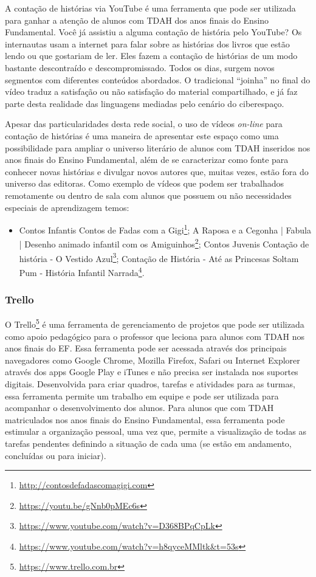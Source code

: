 \documentclass{textolivre}
\begin{document}
A contação de histórias via YouTube é uma ferramenta que pode ser utilizada para ganhar a atenção de alunos com TDAH dos anos finais do Ensino Fundamental. Você já assistiu a alguma contação de história pelo YouTube? Os internautas usam a internet para falar sobre as histórias dos livros que estão lendo ou que gostariam de ler. Eles fazem a contação de histórias de um modo bastante descontraído e descompromissado. Todos os dias, surgem novos segmentos com diferentes conteúdos abordados. O tradicional “joinha” no final do vídeo traduz a satisfação ou não satisfação do material compartilhado, e já faz parte desta realidade das linguagens mediadas pelo cenário do ciberespaço. 

Apesar das particularidades desta rede social, o uso de vídeos \textit{on-line} para contação de histórias é uma maneira de apresentar este espaço como uma possibilidade para ampliar o universo literário de alunos com TDAH inseridos nos anos finais do Ensino Fundamental, além de se caracterizar como fonte para conhecer novas histórias e divulgar novos autores que, muitas vezes, estão fora do universo das editoras. Como exemplo de vídeos que podem ser trabalhados remotamente ou dentro de sala com alunos que possuem ou não necessidades especiais de aprendizagem temos: 

\begin{itemize}
    \item Contos Infantis
    \subitem Contos de Fadas com a Gigi\footnote{\url{http://contosdefadascomagigi.com}};
    \subitem A Raposa e a Cegonha | Fabula | Desenho animado infantil com os Amiguinhos\footnote{\url{https://youtu.be/gNnb0pMEc6s}};
    \subitem Contos Juvenis
    \subitem Contação de história - O Vestido Azul\footnote{\url{https://www.youtube.com/watch?v=D368BPqCpLk}};
    \subitem Contação de História - Até as Princesas Soltam Pum - História Infantil Narrada\footnote{\url{https://www.youtube.com/watch?v=h8qyceMMltk&t=53s}}.
\end{itemize}

\subsubsection{Trello}\label{sec-trello}

O Trello\footnote{\url{https://www.trello.com.br}} é uma ferramenta de gerenciamento de projetos que pode ser utilizada como apoio pedagógico para o professor que leciona para alunos com TDAH nos anos finais do EF. Essa ferramenta pode ser acessada através dos principais navegadores como Google Chrome, Mozilla Firefox, Safari ou Internet Explorer através dos apps Google Play e iTunes e não precisa ser instalada nos suportes digitais. Desenvolvida para criar quadros, tarefas e atividades para as turmas, essa ferramenta permite um trabalho em equipe e pode ser utilizada para acompanhar o desenvolvimento dos alunos. Para alunos que com TDAH matriculados nos anos finais do Ensino Fundamental, essa ferramenta pode estimular a organização pessoal, uma vez que, permite a visualização de todas as tarefas pendentes definindo a situação de cada uma (se estão em andamento, concluídas ou para iniciar). 
\end{document}

